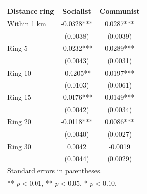 \begin{tabular}{lcc}
\hline\hline
Distance ring & Socialist & Communist \\
\hline
Within 1 km  & -0.0328*** &  0.0287*** \\
       & (0.0038)   & (0.0039)   \\
Ring 5  & -0.0232*** &  0.0289*** \\
       & (0.0043)   & (0.0031)   \\
Ring 10 & -0.0205**  &  0.0197*** \\
       & (0.0103)   & (0.0061)   \\
Ring 15 & -0.0176*** &  0.0149*** \\
       & (0.0042)   & (0.0034)   \\
Ring 20 & -0.0118*** &  0.0086*** \\
       & (0.0040)   & (0.0027)   \\
Ring 30 &  0.0042    & -0.0019    \\
       & (0.0044)   & (0.0029)   \\
\hline
\multicolumn{3}{l}{\footnotesize Standard errors in parentheses.} \\
\multicolumn{3}{l}{\footnotesize *** $p<0.01$, ** $p<0.05$, * $p<0.10$.} \\
\hline\hline
\end{tabular}
